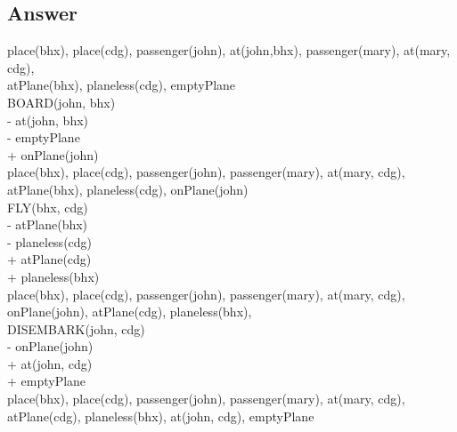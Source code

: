 \documentclass{article}
\begin{document}
\subsection{Answer}
place(bhx),
place(cdg), passenger(john), at(john,bhx), passenger(mary), at(mary, cdg), \\
atPlane(bhx), planeless(cdg), emptyPlane \\ 
\newline 
BOARD(john, bhx) \\
\-\hspace{10mm}  	- at(john, bhx) \\
\-\hspace{10mm}  	- emptyPlane \\
\-\hspace{10mm}  	+ onPlane(john) \\
\newline
place(bhx),
place(cdg), passenger(john), passenger(mary), at(mary, cdg), \\
atPlane(bhx), planeless(cdg), onPlane(john)\\ 
\newline
FLY(bhx, cdg) \\
\-\hspace{10mm} 	- atPlane(bhx) \\
\-\hspace{10mm} 	- planeless(cdg) \\
\-\hspace{10mm} 	+ atPlane(cdg) \\
\-\hspace{10mm} 	+ planeless(bhx) \\
\newline
place(bhx),
place(cdg), passenger(john), passenger(mary), at(mary, cdg), \\
onPlane(john), atPlane(cdg), planeless(bhx),\\ 
\newline
DISEMBARK(john, cdg) \\
\-\hspace{10mm} 	- onPlane(john) \\
\-\hspace{10mm} 	+ at(john, cdg) \\
\-\hspace{10mm} 	+ emptyPlane \\
\newline
place(bhx),
place(cdg), passenger(john), passenger(mary), at(mary, cdg), \\
atPlane(cdg), planeless(bhx), at(john, cdg), emptyPlane\\ 
\end{document}
